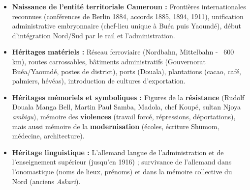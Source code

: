 \documentclass[11pt]{article}
\begin{document}
\begin{aretenir}
\begin{itemize}
    \item \textbf{Naissance de l'entité territoriale \og Cameroun \fg{} :} Frontières internationales reconnues (conférences de Berlin 1884, accords 1885, 1894, 1911), unification administrative embryonnaire (chef-lieu unique à Buéa puis Yaoundé), début d'intégration Nord/Sud par le rail et l'administration.
    \item \textbf{Héritages matériels :} Réseau ferroviaire (Nordbahn, Mittelbahn - ~600 km), routes carrossables, bâtiments administratifs (Gouvernorat Buéa/Yaoundé, postes de district), ports (Douala), plantations (cacao, café, palmiers, hévéas), introduction de cultures d'exportation.
    \item \textbf{Héritages mémoriels et symboliques :} Figures de la \textbf{résistance} (Rudolf Douala Manga Bell, Martin Paul Samba, Madola, chef Koupé, sultan Njoya \emph{ambigu}), mémoire des \textbf{violences} (travail forcé, répressions, déportations), mais aussi mémoire de la \textbf{modernisation} (écoles, écriture Shümom, médecine, architecture).
    \item \textbf{Héritage linguistique :} L'allemand langue de l'administration et de l'enseignement supérieur (jusqu'en 1916) ; survivance de l'allemand dans l'onomastique (noms de lieux, prénoms) et dans la mémoire collective du Nord (anciens \emph{Askari}).
\end{itemize}
\end{aretenir}
\end{document}
